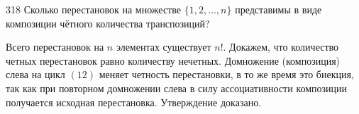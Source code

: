 \begin{task}{318}
Сколько перестановок на множестве $\{1, 2, \ldots, n\}$ представимы в виде композиции чётного количества транспозиций?
\end{task}
\begin{solution}
Всего перестановок на $n$ элементах существует $n!$. Докажем, что количество четных перестановок равно количеству нечетных. Домножение (композиция) слева на цикл $(1 2)$ меняет четность перестановки, в то же время это биекция, так как при повторном домножении слева в силу ассоциативности композиции получается исходная перестановка. Утверждение доказано.
\end{solution}